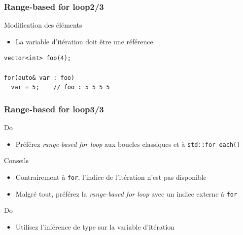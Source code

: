 \documentclass[C++.tex]{subfiles}
\begin{document}
\begin{frame}[fragile]
	\frametitle{Range-based for loop\titlehfill{}2/3}
	\begin{alertblock}{Modification des éléments}
		\begin{itemize}
			\item La variable d'itération doit être une référence
		\end{itemize}
	\end{alertblock}

	\begin{lstlisting}
vector<int> foo(4);

for(auto& var : foo)
  var = 5;    // foo : 5 5 5 5\end{lstlisting}
\end{frame}

\begin{frame}
	\frametitle{Range-based for loop\titlehfill{}3/3}
	\begin{exampleblock}{Do}
		\begin{itemize}
			\item Préférez \textit{range-based for loop} aux boucles classiques et à \lstinline|std::for_each()|
		\end{itemize}
	\end{exampleblock}


	\begin{block}{Conseils}
		\begin{itemize}
			\item Contrairement à \lstinline|for|, l'indice de l'itération n'est pas disponible
			\item Malgré tout, préférez la \textit{range-based for loop} avec un indice externe à \lstinline|for|

		\end{itemize}
	\end{block}

	\begin{exampleblock}{Do}
		\begin{itemize}
			\item Utilisez l'inférence de type sur la variable d'itération
		\end{itemize}
	\end{exampleblock}
\end{frame}
\end{document}

